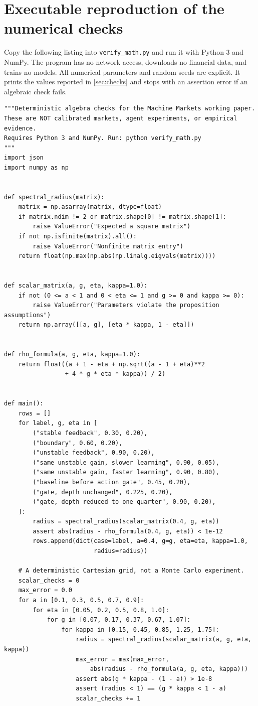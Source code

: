 \documentclass[11pt,a4paper]{article}
\theoremstyle{definition}
\theoremstyle{remark}
\begin{document}
\section{Executable reproduction of the numerical checks}
\label{app:code}
Copy the following listing into \texttt{verify\_math.py} and run it with Python 3 and NumPy. The program has no network access, downloads no financial data, and trains no models. All numerical parameters and random seeds are explicit. It prints the values reported in \cref{sec:checks} and stops with an assertion error if an algebraic check fails.
\begin{lstlisting}
"""Deterministic algebra checks for the Machine Markets working paper.
These are NOT calibrated markets, agent experiments, or empirical evidence.
Requires Python 3 and NumPy. Run: python verify_math.py
"""
import json
import numpy as np


def spectral_radius(matrix):
    matrix = np.asarray(matrix, dtype=float)
    if matrix.ndim != 2 or matrix.shape[0] != matrix.shape[1]:
        raise ValueError("Expected a square matrix")
    if not np.isfinite(matrix).all():
        raise ValueError("Nonfinite matrix entry")
    return float(np.max(np.abs(np.linalg.eigvals(matrix))))


def scalar_matrix(a, g, eta, kappa=1.0):
    if not (0 <= a < 1 and 0 < eta <= 1 and g >= 0 and kappa >= 0):
        raise ValueError("Parameters violate the proposition assumptions")
    return np.array([[a, g], [eta * kappa, 1 - eta]])


def rho_formula(a, g, eta, kappa=1.0):
    return float((a + 1 - eta + np.sqrt((a - 1 + eta)**2
                 + 4 * g * eta * kappa)) / 2)


def main():
    rows = []
    for label, g, eta in [
        ("stable feedback", 0.30, 0.20),
        ("boundary", 0.60, 0.20),
        ("unstable feedback", 0.90, 0.20),
        ("same unstable gain, slower learning", 0.90, 0.05),
        ("same unstable gain, faster learning", 0.90, 0.80),
        ("baseline before action gate", 0.45, 0.20),
        ("gate, depth unchanged", 0.225, 0.20),
        ("gate, depth reduced to one quarter", 0.90, 0.20),
    ]:
        radius = spectral_radius(scalar_matrix(0.4, g, eta))
        assert abs(radius - rho_formula(0.4, g, eta)) < 1e-12
        rows.append(dict(case=label, a=0.4, g=g, eta=eta, kappa=1.0,
                         radius=radius))

    # A deterministic Cartesian grid, not a Monte Carlo experiment.
    scalar_checks = 0
    max_error = 0.0
    for a in [0.1, 0.3, 0.5, 0.7, 0.9]:
        for eta in [0.05, 0.2, 0.5, 0.8, 1.0]:
            for g in [0.07, 0.17, 0.37, 0.67, 1.07]:
                for kappa in [0.15, 0.45, 0.85, 1.25, 1.75]:
                    radius = spectral_radius(scalar_matrix(a, g, eta, kappa))
                    max_error = max(max_error,
                        abs(radius - rho_formula(a, g, eta, kappa)))
                    assert abs(g * kappa - (1 - a)) > 1e-8
                    assert (radius < 1) == (g * kappa < 1 - a)
                    scalar_checks += 1


\end{lstlisting}
\end{document}
